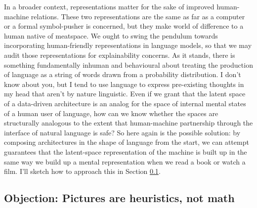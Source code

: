 \begin{fullwidth}
\begin{multicols}{2}
In a broader context, representations matter for the sake of improved human-machine relations. These two representations are the same as far as a computer or a formal symbol-pusher is concerned, but they make world of difference to a human native of meatspace. We ought to swing the pendulum towards incorporating human-friendly representations in language models, so that we may audit those representations for explainability concerns. As it stands, there is something fundamentally inhuman and behavioural about treating the production of language as a string of words drawn from a probability distribution. I don't know about you, but I tend to use language to express pre-existing thoughts in my head that aren't by nature linguistic. Even if we grant that the latent space of a data-driven architecture is an analog for the space of internal mental states of a human user of language, how can we know whether the spaces are structurally analogous to the extent that human-machine partnership through the interface of natural language is safe? So here again is the possible solution: by composing architectures in the shape of language from the start, we can attempt guarantees that the latent-space representation of the machine is built up in the same way we build up a mental representation when we read a book or watch a film. I'll sketch how to approach this in Section \ref{}.

\subsection{\textbf{Objection:} Pictures are heuristics, not math}


\end{multicols}
\end{fullwidth}
